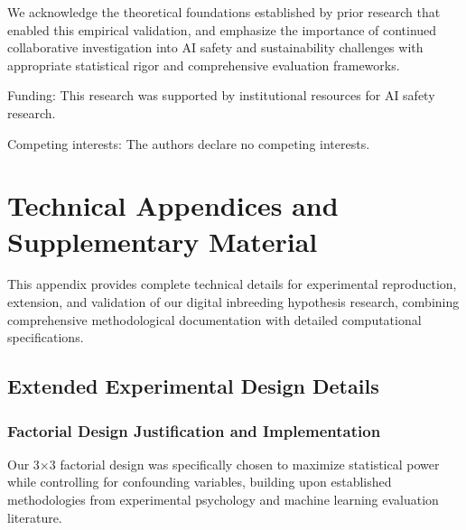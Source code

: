 \documentclass{article}
\begin{document}
\begin{ack}
We acknowledge the theoretical foundations established by prior research that enabled this empirical validation, and emphasize the importance of continued collaborative investigation into AI safety and sustainability challenges with appropriate statistical rigor and comprehensive evaluation frameworks.

Funding: This research was supported by institutional resources for AI safety research.

Competing interests: The authors declare no competing interests.
\end{ack}




\appendix
\section{Technical Appendices and Supplementary Material}

This appendix provides complete technical details for experimental reproduction, extension, and validation of our digital inbreeding hypothesis research, combining comprehensive methodological documentation with detailed computational specifications.

\subsection{Extended Experimental Design Details}
\label{appendix:experimental_design}

\subsubsection{Factorial Design Justification and Implementation}

Our 3×3 factorial design was specifically chosen to maximize statistical power while controlling for confounding variables, building upon established methodologies from experimental psychology and machine learning evaluation literature.
\end{document}
